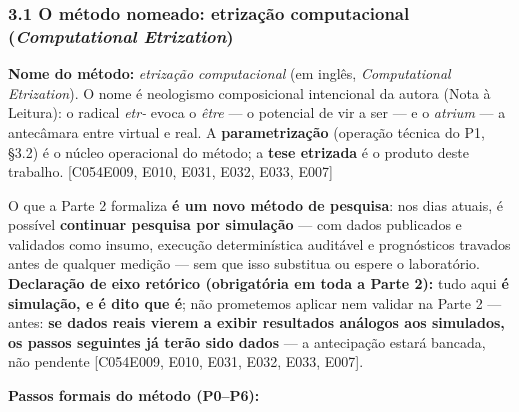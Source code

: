 \documentclass[
  10pt,
]{article}
\begin{document}
\hypertarget{o-muxe9todo-nomeado-etrizauxe7uxe3o-computacional-computational-etrization}{%
\subsubsection{\texorpdfstring{3.1 O método nomeado: etrização
computacional (\emph{Computational
Etrization})}{3.1 O método nomeado: etrização computacional (Computational Etrization)}}\label{o-muxe9todo-nomeado-etrizauxe7uxe3o-computacional-computational-etrization}}

\textbf{Nome do método:} \emph{etrização computacional} (em inglês,
\emph{Computational Etrization}). O nome é neologismo composicional
intencional da autora (Nota à Leitura): o radical \emph{etr-} evoca o
\emph{être} --- o potencial de vir a ser --- e o \emph{atrium} --- a
antecâmara entre virtual e real. A \textbf{parametrização} (operação
técnica do P1, §3.2) é o núcleo operacional do método; a \textbf{tese
etrizada} é o produto deste trabalho. {[}C054\textbar E009, E010, E031,
E032, E033, E007{]}

O que a Parte 2 formaliza \textbf{é um novo método de pesquisa}: nos
dias atuais, é possível \textbf{continuar pesquisa por simulação} ---
com dados publicados e validados como insumo, execução determinística
auditável e prognósticos travados antes de qualquer medição --- sem que
isso substitua ou espere o laboratório. \textbf{Declaração de eixo
retórico (obrigatória em toda a Parte 2):} tudo aqui \textbf{é
simulação, e é dito que é}; não prometemos aplicar nem validar na Parte
2 --- antes: \textbf{se dados reais vierem a exibir resultados análogos
aos simulados, os passos seguintes já terão sido dados} --- a
antecipação estará bancada, não pendente {[}C054\textbar E009, E010,
E031, E032, E033, E007{]}.

\textbf{Passos formais do método (P0--P6):}
\end{document}
